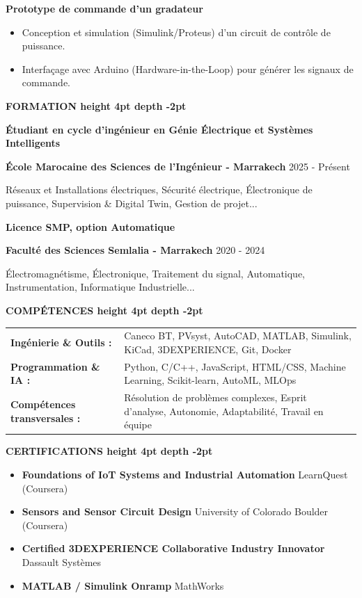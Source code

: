 \documentclass[10pt,a4paper]{altacv}
\renewcommand{\cvsection}[2][]{%
  \vspace{3pt}%
  {\color{heading}\LARGE\bfseries #2 \hspace{0.2em}\leaders\vrule height 4pt depth -2pt\hfill\mbox{}}\par\vspace{2pt}
}
\renewcommand{\cvevent}[4]{%
  {\large\bfseries\color{accent}#1\par}
  \vspace{1pt}\normalsize
  \ifstrequal{#2}{}{}{%
    \textbf{\color{emphasis}#2\ifstrequal{#4}{}{}{ - #4}}%
  }%
  \hfill
  \ifstrequal{#3}{}{}{{\small#3}}%
  \par\vspace{1pt}
}
\begin{document}
{\large\bfseries\color{accent} Prototype de commande d'un gradateur}\\[0.05cm]
\begin{itemize}
  \item Conception et simulation (Simulink/Proteus) d'un circuit de contrôle de puissance.
  \item Interfaçage avec Arduino (Hardware-in-the-Loop) pour générer les signaux de commande.
\end{itemize}

\cvsection{FORMATION}
\cvevent{Étudiant en cycle d'ingénieur en Génie Électrique et Systèmes Intelligents}{École Marocaine des Sciences de l'Ingénieur}{2025 - Présent}{Marrakech}
\small Réseaux et Installations électriques, Sécurité électrique, Électronique de puissance, Supervision \& Digital Twin, Gestion de projet...

\cvevent{Licence SMP, option Automatique}{Faculté des Sciences Semlalia}{2020 - 2024}{Marrakech}
\small Électromagnétisme, Électronique, Traitement du signal, Automatique, Instrumentation, Informatique Industrielle...

\cvsection{COMPÉTENCES}
\begin{tabular}{@{}ll@{}}
\textbf{Ingénierie \& Outils :} & Caneco BT, PVsyst, AutoCAD, MATLAB, Simulink, KiCad, 3DEXPERIENCE, Git, Docker \\[2pt]
\textbf{Programmation \& IA :} & Python, C/C++, JavaScript, HTML/CSS, Machine Learning, Scikit-learn, AutoML, MLOps \\[2pt]
\textbf{Compétences transversales :} & Résolution de problèmes complexes, Esprit d'analyse, Autonomie, Adaptabilité, Travail en équipe \\
\end{tabular}

\cvsection{CERTIFICATIONS}
\begin{itemize}[leftmargin=*, label=\textbullet, itemsep=2pt]
  \item \textbf{Foundations of IoT Systems and Industrial Automation} \hfill {\color{emphasis}LearnQuest (Coursera)}
  \item \textbf{Sensors and Sensor Circuit Design} \hfill {\color{emphasis}University of Colorado Boulder (Coursera)}
  \item \textbf{Certified 3DEXPERIENCE Collaborative Industry Innovator} \hfill {\color{emphasis}Dassault Systèmes}
  \item \textbf{MATLAB / Simulink Onramp} \hfill {\color{emphasis}MathWorks}
\end{itemize}
\end{document}
